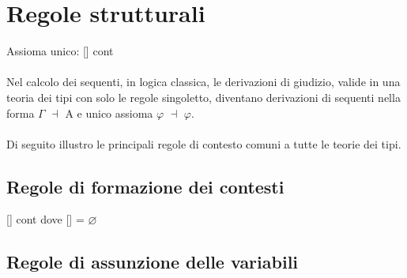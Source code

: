 \documentclass[10pt,a4paper, italian]{book}
\begin{document}
{{\section{Regole strutturali}
\label{sec:regole-strutturali}
Assioma unico: [\hspace{0.1cm}] cont\\\\
Nel calcolo dei sequenti, in logica classica, le derivazioni di giudizio, valide in una teoria dei tipi con solo le regole singoletto, diventano derivazioni di sequenti nella forma $\Gamma$ $\dashv$ A e unico assioma $\varphi$ $\dashv$ $\varphi$.
\\\\
Di seguito illustro le principali regole di contesto comuni a tutte le teorie dei tipi.
\subsection{Regole di formazione dei contesti}
\label{subsec:formazione-contesti}
\begin{center} [\hspace{0.1cm}] cont \quad dove [\hspace{0.1cm}] = $\varnothing$ \end{center}
\begin{prooftree}
\end{prooftree}
\subsection{Regole di assunzione delle variabili}
\label{subsec:assunzione-variabili}
\begin{prooftree}
\end{prooftree}
}}
\end{document}
